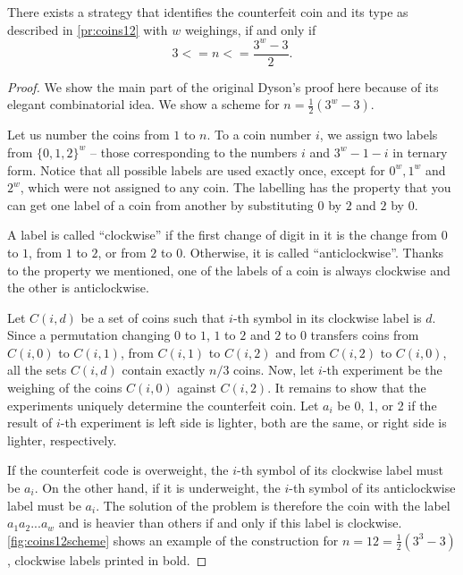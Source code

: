 \begin{theorem}\label{th:coins12}
There exists a strategy that identifies the counterfeit coin and
  its type as described in \autoref{pr:coins12} with $w$ weighings,
  if and only if
  \[ 3 <= n <=\frac{3^w - 3}{2}. \]
\end{theorem}

\begin{proof}
We show the main part of the original Dyson's proof\cite{coins-dyson1946}
  here because of its elegant combinatorial idea.
We show a scheme for $n = \frac{1}{2}(3^w - 3)$.

Let us number the coins from $1$ to $n$.
To a coin number $i$, we assign
  two labels from $\{0,1,2\}^w$ -- those corresponding to the numbers
  $i$ and $3^w - 1 - i$ in ternary form.
Notice that all possible labels are used exactly once, except for $0^w, 1^w$
  and $2^w$, which were not assigned to any coin.
The labelling has the property that you can
  get one label of a coin from another by substituting $0$ by $2$ and $2$ by $0$.

A label is called ``clockwise'' if the first change of digit in it is
the change from $0$ to $1$, from $1$ to $2$, or from $2$ to $0$.
Otherwise, it is called ``anticlockwise''.
Thanks to the property we mentioned, one of the labels of a coin is always
  clockwise and the other is anticlockwise.

Let $C(i, d)$ be a set of coins such that $i$-th symbol in
  its clockwise label is $d$.
Since a permutation changing $0$ to $1$, $1$ to $2$ and $2$ to $0$ transfers
  coins from $C(i,0)$ to $C(i,1)$,
        from $C(i,1)$ to $C(i,2)$ and
        from $C(i,2)$ to $C(i,0)$,
  all the sets $C(i, d)$ contain exactly $n/3$ coins.
Now, let $i$-th experiment be the weighing of the coins $C(i,0)$ against $C(i, 2)$.
It remains to show that the experiments uniquely determine the counterfeit coin.
Let $a_i$ be 0, 1, or 2 if the result of $i$-th experiment is
  left side is lighter, both are the same, or right side is lighter, respectively.

If the counterfeit code is overweight, the $i$-th symbol of its clockwise label
  must be $a_i$. On the other hand, if it is underweight, the $i$-th symbol of
  its anticlockwise label must be $a_i$.
The solution of the problem is therefore the coin with the label $a_1a_2...a_w$
  and is heavier than others if and only if this label is clockwise.
\autoref{fig:coins12scheme} shows an example of the construction for
  $n = 12 = \frac{1}{2}(3^3 - 3)$, clockwise labels printed in bold.


\end{proof}
